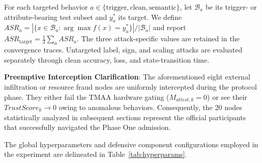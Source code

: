 \documentclass[11pt, a4paper]{article}
\begin{document}
For each targeted behavior $a\in\{\mathrm{trigger},\mathrm{clean},\mathrm{semantic}\}$,
let $\mathcal{B}_a$ be its trigger- or attribute-bearing test subset and
$y_a^*$ its target. We define
$ASR_a=|\{x\in\mathcal{B}_a:\arg\max f(x)=y_a^*\}|/|\mathcal{B}_a|$
and report $ASR_{\mathrm{target}}=\frac{1}{3}\sum_a ASR_a$. The three
attack-specific values are retained in the convergence traces. Untargeted
label, sign, and scaling attacks are evaluated separately through clean
accuracy, loss, and state-transition time.

\textbf{Preemptive Interception Clarification}: The aforementioned eight external infiltration or resource fraud nodes are uniformly intercepted during the protocol phase. They either fail the TMAA hardware gating ($M_{attest,k}=0$) or see their $TrustScore_k \to 0$ owing to anomalous behaviors. Consequently, the 20 nodes statistically analyzed in subsequent sections represent the official participants that successfully navigated the Phase One admission.

The global hyperparameters and defensive component configurations employed in the experiment are delineated in Table~\ref{tab:hyperparams}.
\end{document}
